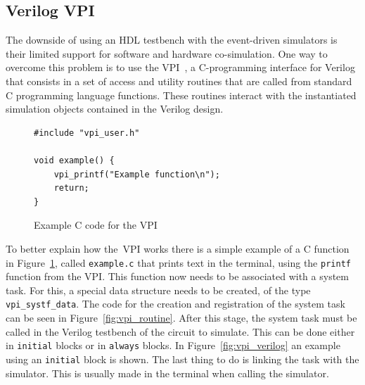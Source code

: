 \documentclass[conference]{IEEEtran}
\begin{document}
\subsection{Verilog VPI}
\label{section:vpi}

The downside of using an HDL testbench with the event-driven simulators is their
limited support for software and hardware co-simulation. One way to overcome
this problem is to use the \ac{VPI}~\cite{vpi}, a C-programming interface for
Verilog that consists in a set of access and utility routines that are called
from standard C programming language functions. These routines interact with the
instantiated simulation objects contained in the Verilog design.

\lstset{language=C}
\lstset{basicstyle=\scriptsize}
\begin{figure}[!htb]
\begin{minipage}{\linewidth}
\begin{lstlisting}[frame=single]
#include "vpi_user.h"
			
void example() {
	vpi_printf("Example function\n");
	return;
}
\end{lstlisting}
\end{minipage}
\caption{Example C code for the VPI}
\label{fig:vpi_c}
\end{figure}
\lstset{basicstyle=\normalsize}

To better explain how the~\ac{VPI} works there is a simple example of a C
function in Figure~\ref{fig:vpi_c}, called {\tt example.c} that prints text in
the terminal, using the {\tt printf} function from the \ac{VPI}. This function
now needs to be associated with a system task. For this, a special data
structure needs to be created, of the type {\tt vpi\_systf\_data}. The code for
the creation and registration of the system task can be seen in
Figure~\ref{fig:vpi_routine}. After this stage, the system task must be called
in the Verilog testbench of the circuit to simulate. This can be done either in
{\tt initial} blocks or in {\tt always} blocks. In Figure~\ref{fig:vpi_verilog}
an example using an {\tt initial} block is shown. The last thing to do is
linking the task with the simulator. This is usually made in the terminal when
calling the simulator.
\end{document}
